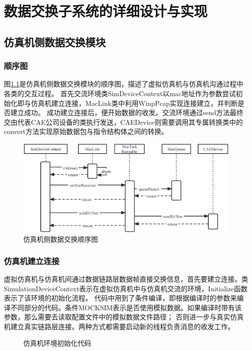 \chapter{数据交换子系统的详细设计与实现}
\section{仿真机侧数据交换模块}
\subsection{顺序图}
图\ref{seq1}是仿真机侧数据交换模块的顺序图，描述了虚拟仿真机与仿真机沟通过程中各类的交互过程。
首先交流环境类SimDeviceContext以mac地址作为参数尝试初始化即与仿真机建立连接，MacLink类中利用WinpPcap实现连接建立，并判断是否建立成功。
成功建立连接后，便开始数据的收发。交流环境通过send方法最终交由代表CAE公司设备的类执行发送，CAEDevice则需要调用其专属转换类中的convert方法实现原始数据包与指令结构体之间的转换。
\begin{figure}[h!]
    \begin{center}
        \includegraphics[width=\textwidth]{pictures/sequence1.pdf}
        \caption{仿真机侧数据交换顺序图}
        \label{seq1}
    \end{center}
\end{figure}
\subsection{仿真机建立连接}
虚拟仿真机与仿真机间通过数据链路层数据帧直接交换信息，首先要建立连接。类SimulationDeviceContext表示在虚拟仿真机中与仿真机交流的环境，Initialize函数表示了该环境的初始化流程。
代码中用到了条件编译，即根据编译时的参数来编译不同部分的代码。条件MOCKSIM表示是否使用模拟数据。如果编译时带有该参数，那么需要去读取配置文件中的模拟数据文件路径；
否则进一步与真实仿真机建立真实链路层连接。两种方式都需要启动新的线程负责消息的收发工作。
\begin{figure}[h!]
    \centering
     
    \caption{仿真机环境初始化代码}
    \label{code1}
\end{figure}

